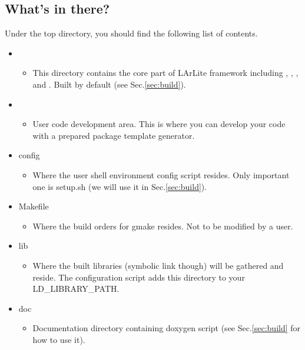 \subsection{What's in there?}
Under the top directory, you should find the following list of contents.
\begin{itemize}

    \item \Core
      \begin{itemize}
          \item This directory contains the core part of LArLite framework including \Base, \DataFormat, \Analysis, and \LArUtil. Built by default (see Sec.\ref{sec:build}). 
      \end{itemize}

    \item \UserDev
      \begin{itemize}
          \item User code development area. This is where you can develop your code with a prepared package template generator.
      \end{itemize}

    \item {\ttfamily config}
      \begin{itemize}
          \item Where the user shell environment config script resides. Only important one is {\ttfamily setup.sh} (we will use it in Sec.\ref{sec:build}).
      \end{itemize}

    \item {\ttfamily Makefile}
      \begin{itemize}
          \item Where the build orders for {\ttfamily gmake} resides. Not to be modified by a user.
      \end{itemize}

    \item {\ttfamily lib}
      \begin{itemize}
          \item Where the built libraries (symbolic link though) will be gathered and reside. The configuration script adds this directory to your {\ttfamily LD\_LIBRARY\_PATH}.
      \end{itemize}

    \item {\ttfamily doc}
      \begin{itemize}
          \item Documentation directory containing doxygen script (see Sec.\ref{sec:build} for how to use it).
      \end{itemize}


\end{itemize}
